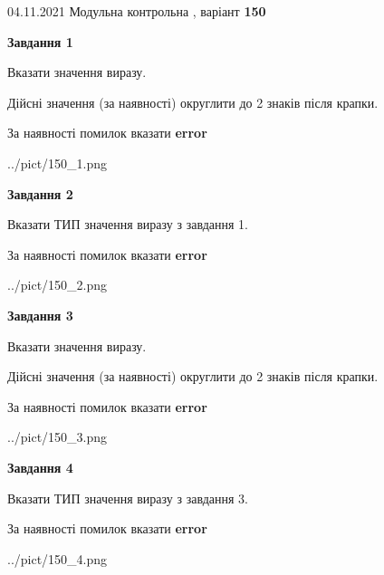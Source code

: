 \documentclass[11pt, ukrainian]{article}
\begin{document}
{04.11.2021 Модульна контрольна , варіант  \No \textbf { 150 }\par}
{
\begin {large}
{\begin {center}\textbf{Завдання 1}\end {center}}\par
Вказати значення виразу. \par
Дійсні значення (за наявності) округлити до 2 знаків після крапки. \par
За наявності помилок вказати \textbf{error}

\begin{center}
	{../pict/150_1.png}
\end{center}
\newpage

{\begin {center}\textbf{Завдання 2}\end {center}}\par
Вказати ТИП значення виразу з завдання 1. \par
За наявності помилок вказати \textbf{error}

\begin{center}
	{../pict/150_2.png}
\end{center}
\newpage

{\begin {center}\textbf{Завдання 3}\end {center}}\par
Вказати значення виразу. \par
Дійсні значення (за наявності) округлити до 2 знаків після крапки. \par
За наявності помилок вказати \textbf{error}

\begin{center}
	{../pict/150_3.png}
\end{center}
\newpage

{\begin {center}\textbf{Завдання 4}\end {center}}\par
Вказати ТИП значення виразу з завдання 3. \par
За наявності помилок вказати \textbf{error}

\begin{center}
	{../pict/150_4.png}
\end{center}
\newpage


\end{large}}
\end{document}
